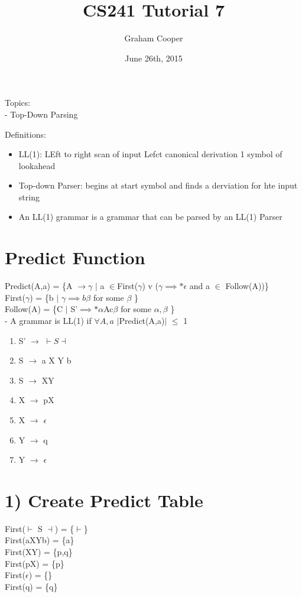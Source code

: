 \documentclass[12pt]{article}
\title{\vspace{-15ex}CS241 Tutorial 7\vspace{-1ex}}
\date{June 26th, 2015}
\author{Graham Cooper}
\begin{document}
	\maketitle
	
	Topics:\\
	- Top-Down Parsing
	
	Definitions:\\
	\begin{itemize}
		\item LL(1): LEft to right scan of input Lefct canonical derivation 1 symbol of lookahead
		\item Top-down Parser: begins at start symbol and finds a derviation for hte input string
		\item An LL(1) grammar is a grammar that can be parsed by an LL(1) Parser
	\end{itemize}
	
	\section*{Predict Function}
	Predict(A,a) = \{A $\rightarrow \gamma$ $|$ a $\in $First($\gamma$) v ($\gamma \implies* \epsilon$ and a $\in $ Follow(A))\}\\
	First($\gamma$) = \{b $|$ $\gamma \implies b\beta$ for some $\beta$ \}\\
	Follow(A) = \{C $|$ S'$\implies* \alpha$Ac$\beta$ for some $\alpha,\beta$ \}\\
	- A grammar is LL(1) if $\forall A,a$ $|$Predict(A,a)$|$ $\leq$ 1\\
	
	\begin{enumerate}
		\item S' $\rightarrow$ $\vdash S \dashv$
		\item S $\rightarrow$ a X Y b
		\item S $\rightarrow$ XY
		\item X $\rightarrow$ pX
		\item X $\rightarrow$ $\epsilon$
		\item Y $\rightarrow$ q
		\item Y $\rightarrow$ $\epsilon$
	\end{enumerate}
	
	\section*{1) Create Predict Table}
	First($\vdash$ S $\dashv$) = \{$\vdash$\}\\
	First(aXYb) = \{a\}\\
	First(XY) = \{p,q\}\\
	First(pX) = \{p\}\\
	First($\epsilon$) = \{\}\\
	First(q) = \{q\}\\
	
\end{document}
